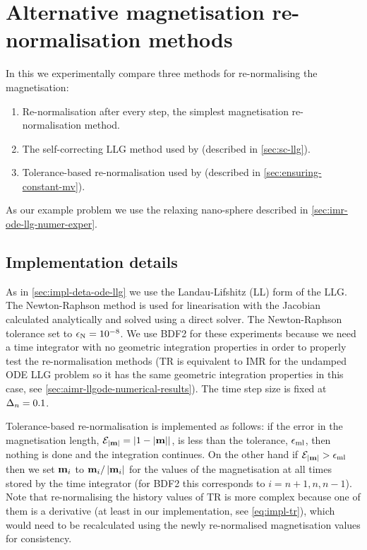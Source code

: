 


\FloatBarrier
\chapter{Alternative magnetisation re-normalisation methods}
\label{sec:magn-renorm-meth}

In this  we experimentally compare three methods for re-normalising the magnetisation:
\begin{enumerate}
\item Re-normalisation after every step, the simplest magnetisation re-normalisation method.
\item The self-correcting LLG method used by \nmag (described in \cref{sec:sc-llg}).
\item Tolerance-based re-normalisation used by \magpar (described in \cref{sec:ensuring-constant-mv}).
\end{enumerate}

As our example problem we use the relaxing nano-sphere described in \cref{sec:imr-ode-llg-numer-exper}.

\section{Implementation details}

As in \cref{sec:impl-deta-ode-llg} we use the Landau-Lifshitz (LL) form of the LLG.
The Newton-Raphson method is used for linearisation with the Jacobian calculated analytically and solved using a direct solver.
The Newton-Raphson tolerance set to $\epsilon_{\mathrm{N}} = 10^{-8}$.
We use BDF2 for these experiments because we need a time integrator with no geometric integration properties in order to properly test the re-normalisation methods (TR is equivalent to IMR for the undamped ODE LLG problem so it has the same geometric integration properties in this case, see \cref{sec:aimr-llgode-numerical-results}).
The time step size is fixed at $\Delta_{n} = 0.1$.

Tolerance-based re-normalisation is implemented as follows:
if the error in the magnetisation length, $\mathcal{E}_{\left|{\boldsymbol{\mathrm{m}}} \right|} = \left|{1 - \left|{\boldsymbol{\mathrm{m}}} \right|} \right|$, is less than the tolerance, $\epsilon_{\mathrm{ml}}$, then nothing is done and the integration continues.
On the other hand if $\mathcal{E}_{\left|{\boldsymbol{\mathrm{m}}} \right|} > \epsilon_{\mathrm{ml}}$ then we set $\boldsymbol{\mathrm{m}}_{i}$ to $\boldsymbol{\mathrm{m}}_{i}/\left|{\boldsymbol{\mathrm{m}}_{i}} \right|$ for the values of the magnetisation at all times stored by the time integrator (for BDF2 this corresponds to $i=n+1, n, n-1$).
Note that re-normalising the history values of TR is more complex because one of them is a derivative (at least in our implementation, see \cref{eq:impl-tr}), which would need to be recalculated using the newly re-normalised magnetisation values for consistency.

